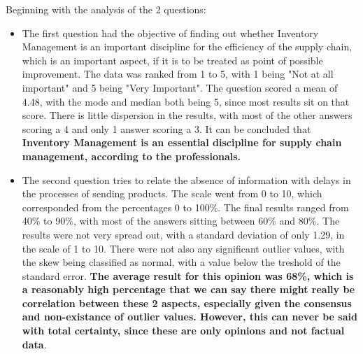 \pagebreak

Beginning with the analysis of the 2 questions:
\begin{itemize}
  \item The first question had the objective of finding out whether Inventory Management is an important discipline for the efficiency of the supply chain, which is an important aspect, if it is to be treated as point of possible improvement. The data was ranked from 1 to 5, with 1 being "Not at all important" and 5 being "Very Important". The question scored a mean of 4.48, with the mode and median both being 5, since most results sit on that score. There is little dispersion in the results, with most of the other answers scoring a 4 and only 1 answer scoring a 3. It can be concluded that \textbf{Inventory Management is an essential discipline for supply chain management, according to the professionals.}
  \item The second question tries to relate the absence of information with delays in the processes of sending products. The scale went from 0 to 10, which corresponded from the percentages 0 to 100\%. The final results ranged from 40\% to 90\%, with most of the answers sitting between 60\% and 80\%. The results were not very spread out, with a standard deviation of only 1.29, in the scale of 1 to 10. There were not also any significant outlier values, with the skew being classified as normal, with a value below the treshold of the standard error. \textbf{The average result for this opinion was 68\%, which is a reasonably high percentage that we can say there might really be correlation between these 2 aspects, especially given the consensus and non-existance of outlier values. However, this can never be said with total certainty, since these are only opinions and not factual data}. 
\end{itemize}


